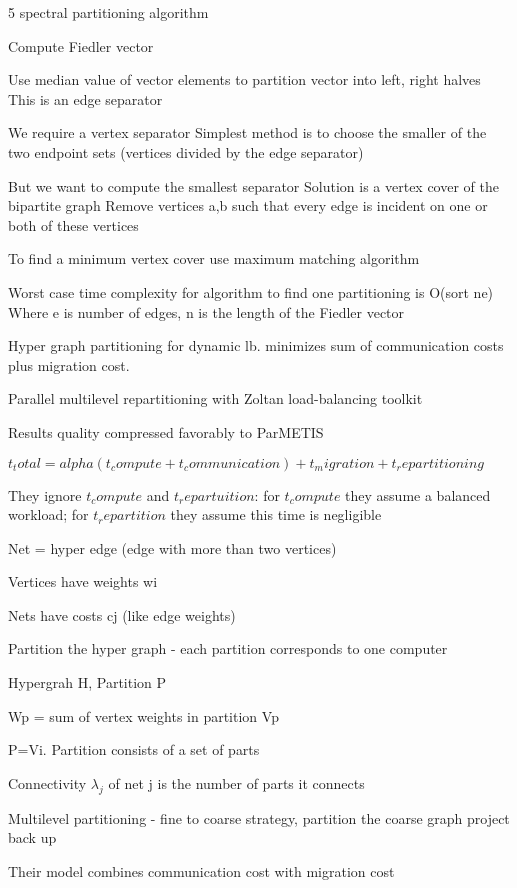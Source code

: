 \documentclass{article}
\begin{document}
5 spectral partitioning algorithm

Compute Fiedler vector

Use median value of vector elements to partition vector into left, right halves
This is an edge separator

We require a vertex separator
Simplest method is to choose the smaller of the two  endpoint sets (vertices divided by the edge separator)

But we want to compute the smallest separator
Solution is a vertex cover of the bipartite graph
Remove vertices a,b such that every edge is incident on one or both of these vertices

To find a minimum vertex cover use maximum matching algorithm

Worst case time complexity for algorithm to find one partitioning is O(sort ne)
Where e is number of edges, n is the length of the Fiedler vector



\cite{4227986}


Hyper graph partitioning for dynamic lb.  minimizes sum of communication costs plus migration cost.

Parallel multilevel repartitioning with Zoltan load-balancing toolkit

Results quality compressed favorably to ParMETIS

$t_total = alpha ( t_compute + t_communication ) + t_migration + t_repartitioning$

They ignore $t_compute$ and $t_repartuition$: for $t_compute$ they assume a balanced workload; for $t_repartition$ they assume this time is negligible

Net = hyper edge (edge with more than two vertices)

Vertices have weights wi 

Nets have costs cj (like edge weights)

Partition the hyper graph - each partition corresponds to one computer

Hypergrah H, Partition P

Wp = sum of vertex weights in partition Vp

P={Vi}. Partition consists of a set of parts 

Connectivity $\lambda_j$ of net j is the number of parts it connects

Multilevel partitioning - fine to coarse strategy, partition the coarse graph project back up

Their model combines communication cost with migration cost
\end{document}
